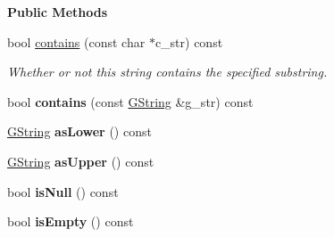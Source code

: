 \begin{Indent}\textbf{ Public Methods}\par
\begin{DoxyCompactItemize}
\item 
\mbox{\label{classrev_1_1_g_string_view_ae17023d60647b5129de5ad6f5b26e175}} 
bool \mbox{\hyperlink{classrev_1_1_g_string_view_ae17023d60647b5129de5ad6f5b26e175}{contains}} (const char $\ast$c\+\_\+str) const
\begin{DoxyCompactList}\small\item\em Whether or not this string contains the specified substring. \end{DoxyCompactList}\item 
\mbox{\label{classrev_1_1_g_string_view_ab01e31af45f32c24a19096503a67535e}} 
bool {\bfseries contains} (const \mbox{\hyperlink{classrev_1_1_g_string}{G\+String}} \&g\+\_\+str) const
\item 
\mbox{\label{classrev_1_1_g_string_view_a519cfc34ceaed5b0d8658178663a3917}} 
\mbox{\hyperlink{classrev_1_1_g_string}{G\+String}} {\bfseries as\+Lower} () const
\item 
\mbox{\label{classrev_1_1_g_string_view_a8bc80698ffe3297677b61651e6196261}} 
\mbox{\hyperlink{classrev_1_1_g_string}{G\+String}} {\bfseries as\+Upper} () const
\item 
\mbox{\label{classrev_1_1_g_string_view_a3797885d2859e1baf99e25fadcddaed7}} 
bool {\bfseries is\+Null} () const
\item 
\mbox{\label{classrev_1_1_g_string_view_a9787bc6f97bbbfc69445d884c6f8a1b1}} 
bool {\bfseries is\+Empty} () const
\end{DoxyCompactItemize}
\end{Indent}
